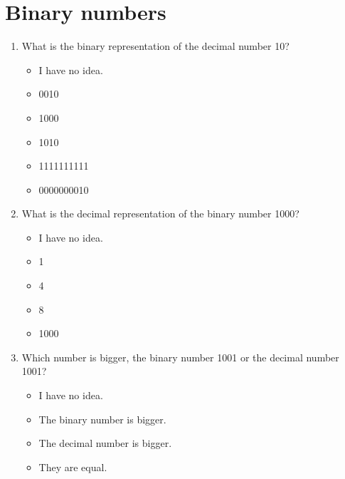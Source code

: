 \section{Binary numbers}
\begin{framed}
\begin{enumerate}
	\item What is the binary representation of the decimal number 10?
		\begin{itemize}
			\item I have no idea.
			\item 0010
			\item 1000
			\item 1010
			\item 1111111111
			\item 0000000010
		\end{itemize}
	\item What is the decimal representation of the binary number 1000?
		\begin{itemize}
			\item I have no idea.
			\item 1
			\item 4
			\item 8
			\item 1000
		\end{itemize}
	\item Which number is bigger, the binary number 1001 or the decimal number
		1001?
		\begin{itemize}
			\item I have no idea.
			\item The binary number is bigger.
			\item The decimal number is bigger.
			\item They are equal.
		\end{itemize}
\end{enumerate}
\end{framed}
